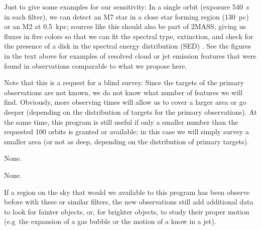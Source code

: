 \documentclass[12pt]{article}
\begin{document}
Just to give some examples for our sensitivity: In a single orbit (exposure 540~s in each filter), we can detect an M7 star in a close star forming region (130~pc) or an M2 at 0.5~kpc; sources like this should also be part of 2MASS, giving us fluxes in five colors so that we can fit the spectral type, extinction, and check for the presence of a disk in the spectral energy distribution (SED) \citep{2007ApJS..169..328R}.
See the figures in the text above for examples of resolved cloud or jet emission features that were found in observations comparable to what we propose here.

Note that this is a request for a blind survey. Since the targets of the primary observations are not known, we do not know what number of features we will find. Obviously, more observing times will allow us to cover a larger area or go deeper (depending on the distribution of targets for the primary observations). At the same time, this program is still useful if only a smaller number than the requested 100 orbits is granted or available; in this case we will simply survey a smaller area (or not as deep, depending on the distribution of primary targets).




%
%
\specialreq             %
None.


%
%
\coordinatedobs          %
None.


%
%
\duplications           %
If a region on the sky that would we available to this program has been observe before with these or similar filters, the new observations still add additional data to look for fainter objects, or, for brighter objects, to study their proper motion (e.g\ the expansion of a gas bubble or the motion of a know in a jet).


\end{document}
